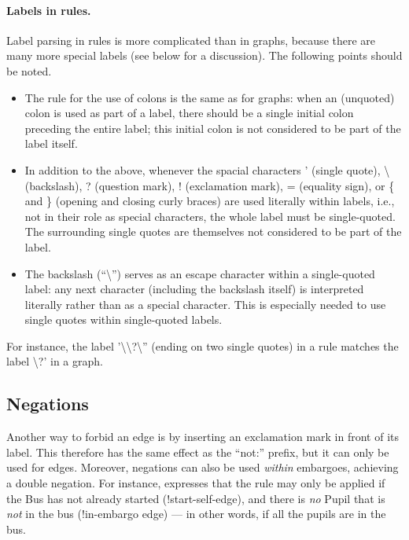 
\paragraph{Labels in rules.}

Label parsing in rules is more complicated than in graphs, because there are
many more special labels (see below for a discussion). The following points
should be noted.
%
\begin{itemize}\noitemsep
\item The rule for the use of colons is the same as for graphs: when an
  (unquoted) colon is used as part of a label, there should be a single initial
  colon preceding the entire label; this initial colon is not considered to be
  part of the label itself.

\item In addition to the above, whenever the spacial characters \textsf{'}
  (single quote), \textsf{\textbackslash} (backslash), \textsf{?} (question
  mark), \textsf{!}  (exclamation mark), \textsf{=} (equality sign), or
  \textsf{\{} and \textsf{\}} (opening and closing curly braces) are used
  literally within labels, i.e., not in their role as special characters, the
  whole label must be single-quoted. The surrounding single quotes are
  themselves not considered to be part of the label.

\item The backslash (``\textsf{\textbackslash}'') serves as an escape character
  within a single-quoted label: any next character (including the backslash
  itself) is interpreted literally rather than as a special character. This is
  especially needed to use single quotes within single-quoted labels.
\end{itemize}
%
For instance, the label \textsf{'\textbackslash\textbackslash?\textbackslash''}
(ending on two single quotes) in a rule matches the label
\textsf{\textbackslash?'} in a graph.

\subsection{Negations}

Another way to forbid an edge is by inserting an exclamation mark in front of
its label. This therefore has the same effect as the ``\textsf{not:}'' prefix,
but it can only be used for edges. Moreover, negations can also be used
\emph{within} embargoes, achieving a double negation. For instance,
 expresses that the rule may only be applied if the
\textsf{Bus} has not already started (\textsf{!start}-self-edge), and there is
\emph{no} \textsf{Pupil} that is \emph{not} in the bus (\textsf{!in}-embargo
edge) --- in other words, if all the pupils are in the bus.

